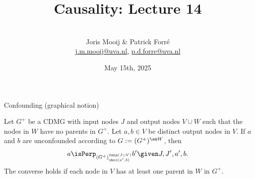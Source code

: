 \title[Causality]{Causality: Lecture 14}
\author[Joris Mooij]{\\[5mm]\large Joris Mooij \& Patrick Forr\'e\\
\url{j.m.mooij@uva.nl}, \url{p.d.forre@uva.nl}}
\date[2025-05-15]{\normalsize May 15th, 2025}
\maketitle

\begin{frame}{Confounding (graphical notion)}
\begin{Prp}[\ref{prp:graph_unconfounded2}]
  Let $G^+$ be a CDMG with input nodes $J$ and output nodes $V \cup W$ such that the nodes in $W$ have no parents in $G^+$.
  Let $a,b \in V$ be distinct output nodes in $V$.
  If $a$ and $b$ are unconfounded according to $G := (G^+)^{\sm W}$, then
  $$a \isPerp_{(G^+)^{\twin(J \cup V)}_{\doit(a',b)}} b' \given J, J', a', b.$$
  The converse holds if each node in $V$ has at least one parent in $W$ in $G^+$.
\end{Prp}
\end{frame}


